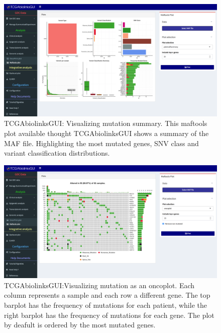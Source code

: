 \begin{figure}[h!]

\includegraphics[width=1.0\linewidth]{images/maftools_summary.png}

  \caption[TCGAbiolinksGUI: Visualizing mutation summary]{TCGAbiolinksGUI: Visualizing mutation summary. This maftools plot available thought TCGAbiolinksGUI shows a summary of the MAF file. Highlighting the most mutated genes, SNV class and variant classification distributions. }
  \label{fig:maftoools_summary}
\end{figure}


\begin{figure}[h!]

\includegraphics[width=1.0\linewidth]{images/maftools_oncoplot.png}

  \caption[TCGAbiolinksGUI: Visualizing mutation as an oncoplot]{TCGAbiolinksGUI:Visualizing mutation as an oncoplot. Each column
  represents a sample and each row a different gene. The top barplot has the frequency of mutations for each patient, while
  the right barplot has the frequency of mutations for each gene. The plot by deafult is ordered by the most mutated genes.}
  \label{fig:maftoools_oncoplot}
\end{figure}


